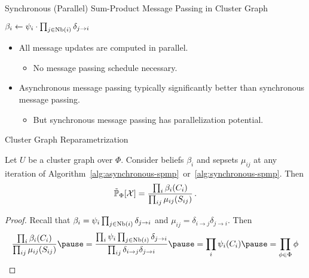 \begin{frame}{Synchronous (Parallel) Sum-Product Message Passing in Cluster Graph}
\begin{minipage}{0.6\textwidth}
\begin{algorithm}[H]
    {
        $\beta_i \leftarrow \psi_i \cdot \prod_{j \in \text{Nb}(i)} \delta_{j \rightarrow i}$\;
    }
\end{algorithm}
\end{minipage}
    \begin{minipage}{0.39\textwidth}
        \begin{itemize}
            \pause \item All message updates are computed in parallel.
            \begin{itemize}
                \pause \item No message passing schedule necessary.
            \end{itemize}
            \pause \item Asynchronous message passing typically significantly better than synchronous message passing.
            \begin{itemize}
                \pause \item But synchronous message passing has parallelization potential.
            \end{itemize}
        \end{itemize}
\end{minipage}
\end{frame}

\begin{frame}{Cluster Graph Reparametrization}
    \begin{theorem}
        Let $U$ be a cluster graph over $\Phi$. Consider beliefs $\beta_i$ and sepsets $\mu_{ij}$ at any iteration of Algorithm~\ref{alg:asynchronous-spmp}~or~\ref{alg:synchronous-spmp}.
        Then
        \begin{equation}
            \tilde{\Pb}_{\Phi}[\mathcal{X}] = \frac{\prod_i \beta_i(C_i)}{\prod_{ij} \mu_{ij}(S_{ij})}\,.
        \end{equation}
    \end{theorem}
    \pause
    \begin{proof}
        Recall that $\beta_i = \psi_i \prod_{j \in \text{Nb}(i)} \delta_{j \rightarrow i}$ and $\mu_{ij} = \delta_{i \rightarrow j} \delta_{j \rightarrow i}$.
        \pause
        Then
        \begin{equation}
           \frac{\prod_i \beta_i(C_i)}{\prod_{ij} \mu_{ij}(S_{ij})} 
           \pause= \frac{\prod_i \psi_i \prod_{j \in \Nb(i)} \delta_{j \rightarrow i}}{\prod_{ij} \delta_{i \rightarrow j} \delta_{j \rightarrow i}}
           \pause = \prod_{i} \psi_i(C_i) 
           \pause = \prod_{\phi \in \Phi} \phi
        \end{equation}
    \end{proof}
\end{frame}


